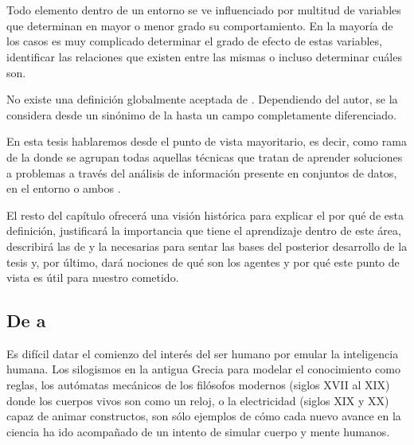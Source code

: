 \chapter{}
\label{ch:sota-ci}

Todo elemento dentro de un entorno se ve influenciado por multitud de variables que determinan en mayor o menor grado su comportamiento. En la mayoría de los casos es muy complicado determinar el grado de efecto de estas variables, identificar las relaciones que existen entre las mismas o incluso determinar cuáles son.

No existe una definición globalmente aceptada de . Dependiendo del autor, se la considera desde un sinónimo de la  hasta un campo completamente diferenciado.

En esta tesis hablaremos desde el punto de vista mayoritario, es decir, como rama de la  donde se agrupan todas aquellas técnicas que tratan de aprender soluciones a problemas a través del análisis de información presente en conjuntos de datos, en el entorno o ambos \cite{rutkowski2008computational, siddique2013computational}.

El resto del capítulo ofrecerá una visión histórica para explicar el por qué de esta definición, justificará la importancia que tiene el aprendizaje dentro de este área, describirá las de  y la  necesarias para sentar las bases del posterior desarrollo de la tesis y, por último, dará nociones de qué son los agentes y por qué este punto de vista es útil para nuestro cometido.

\section{De  a }

Es difícil datar el comienzo del interés del ser humano por emular la inteligencia humana. Los silogismos en la antigua Grecia para modelar el conocimiento como reglas, los autómatas mecánicos de los filósofos modernos (siglos XVII al XIX) donde los cuerpos vivos son como un reloj, o la electricidad (siglos XIX y XX) capaz de animar constructos, son sólo ejemplos de cómo cada nuevo avance en la ciencia ha ido acompañado de un intento de simular cuerpo y mente humanos.

